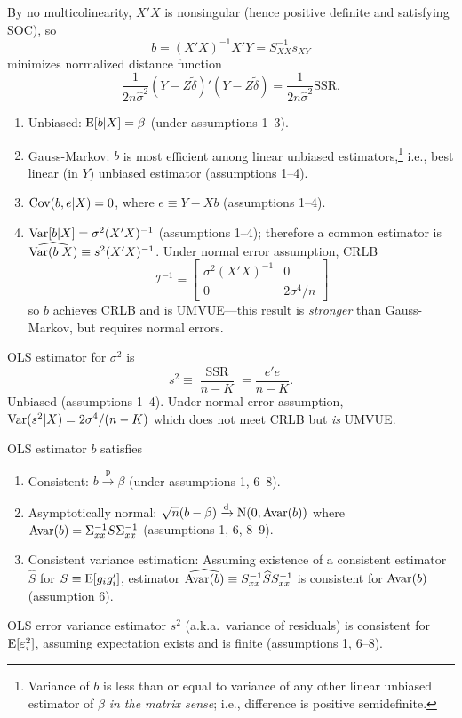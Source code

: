 \documentclass[8pt,letterpaper, landscape]{extarticle} %
\begin{document}
\begin{multicols}{3}
\begin{description}
By no multicolinearity, $ X' X $ is nonsingular (hence positive definite and satisfying SOC), so
$$ b = (X' X)^{-1} X'Y = S_{XX}^{-1} s_{XY} $$
minimizes normalized distance function
\[ \frac{1}{2 n \hat{\sigma}^2} (Y - Z \tilde{\delta})' (Y - Z \tilde{\delta}) = \frac{1}{2 n \hat{\sigma}^2} \text{SSR}. \]
\begin{enumerate}
\item Unbiased: $ \operatorname{E} [b | X] = \beta $ (under assumptions 1--3).
\item Gauss-Markov: $ b $ is most efficient among linear unbiased estimators,\footnote{Variance of $ b $ is less than or equal to variance of any other linear unbiased estimator of $ \beta $ \textit{in the matrix sense}; i.e., difference is positive semidefinite.} i.e., best linear (in $ Y $) unbiased estimator (assumptions 1--4).
\item $ \operatorname{Cov} (b, e | X) = 0 $, where $ e \equiv Y - Xb $ (assumptions 1--4).
\item $ \operatorname{Var} [b | X] = \sigma^2 (X'X)^{-1} $ (assumptions 1--4); therefore a common estimator is $ \widehat{\operatorname{Var} (b|X)} \equiv s^2 (X'X)^{-1} $. Under normal error assumption, CRLB
$$ \mathcal{I}^{-1} =  \begin{bmatrix}
\sigma^{2} (X'X)^{-1} & 0 \\
0 & 2 \sigma^{4} / n
\end{bmatrix} $$
so $ b $ achieves CRLB and is UMVUE---this result is \textit{stronger} than Gauss-Markov, but requires normal errors.
\end{enumerate}

OLS estimator for $ \sigma^2 $ is $$ s^2 \equiv \frac{\operatorname{SSR}}{n-K} = \frac{e'e}{n-K}. $$
Unbiased (assumptions 1--4). Under normal error assumption, $ \operatorname{Var} (s^2 | X) = 2 \sigma^4 / (n-K) $ which does not meet CRLB but \textit{is} UMVUE.

 OLS estimator $ b $ satisfies
\begin{enumerate}
\item Consistent: $ b \xrightarrow{\text{p}} \beta $ (under assumptions 1, 6--8).
\item Asymptotically normal: $ \sqrt{n} (b - \beta) \xrightarrow{\text{d}} \operatorname{N} (0, \operatorname{Avar} (b)) $ where $ \operatorname{Avar} (b) = \Sigma_{xx}^{-1} S \Sigma_{xx}^{-1} $ (assumptions 1, 6, 8--9).
\item Consistent variance estimation: Assuming existence of a consistent estimator $ \widehat{S} $ for $ S \equiv \operatorname{E} [g_i g_{i}' ] $, estimator $ \widehat{\operatorname{Avar} (b)} \equiv S_{xx}^{-1} \widehat{S} S_{xx}^{-1} $ is consistent for $ \operatorname{Avar} (b) $ (assumption 6).
\end{enumerate}
OLS error variance estimator $ s^2 $ (a.k.a.\ variance of residuals) is consistent for $ \operatorname{E} [\varepsilon_{i}^{2}] $, assuming expectation exists and is finite (assumptions 1, 6--8).


\end{description}
\end{multicols}
\end{document}
